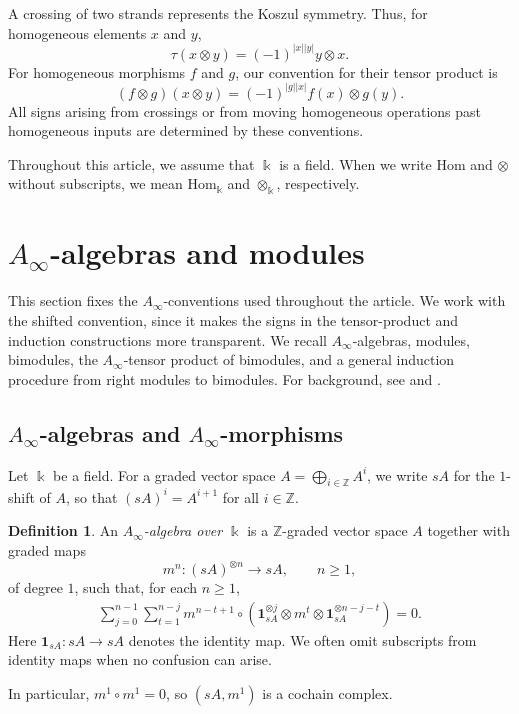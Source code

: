 \documentclass[a4paper, 11pt]{amsart}
\theoremstyle{definition}
\newtheorem{defn}[thm]{Definition}
\theoremstyle{remark}
\numberwithin{equation}{section}
\newcommand{\Hom}{\mathrm{Hom}}
\begin{document}
A crossing of two strands represents the Koszul symmetry. Thus, for
homogeneous elements $x$ and $y$,
\[
\tau(x\otimes y)=(-1)^{|x||y|}y\otimes x.
\]
For homogeneous morphisms $f$ and $g$, our convention for their tensor
product is
\[
(f\otimes g)(x\otimes y)
   =(-1)^{|g||x|}f(x)\otimes g(y).
\]
All signs arising from crossings or from moving homogeneous
operations past homogeneous inputs are determined by these
conventions.







Throughout this article, we assume that $\Bbbk$ is a field. When we write $\Hom$ and $\otimes$ without subscripts, we mean $\Hom_\Bbbk$ and $\otimes_\Bbbk$, respectively.



\section{\texorpdfstring{$A_{\infty}$}{}-algebras and modules}\label{section:ainfinityalgebra}

This section fixes the $A_\infty$-conventions used throughout the article. We work with the shifted convention, since it makes the signs in the tensor-product and induction constructions more transparent. We recall $A_\infty$-algebras, modules, bimodules, the $A_\infty$-tensor product of bimodules, and a general induction procedure from right modules to bimodules. For background, see \cite[Section 5]{GJ} and \cite[Section 2]{Vor}.

\subsection{\texorpdfstring{$A_{\infty}$}{}-algebras and \texorpdfstring{$A_{\infty}$}{}-morphisms}\label{subsection:Ainfinityalgebra}
Let $\Bbbk$ be a field. For a graded vector space $A=\bigoplus_{i\in \mathbb Z} A^i$, we write $sA$ for the $1$-shift of $A$, so that $(sA)^i=A^{i+1}$ for all $i\in \mathbb Z$.
\begin{defn}
An {\it $A_{\infty}$-algebra over $\Bbbk$} is a $\mathbb Z$-graded vector space $A$ together with graded maps
\[
m^n \colon (sA)^{\otimes n} \to sA,
\qquad n\geq 1,
\]
of degree $1$, such that, for each $n\geq 1$,
\begin{align}\label{align:A-infinity3}
 \sum_{j=0}^{n-1}\sum_{t=1}^{n-j} m^{n-t+1}\circ (\mathbf 1_{s A} ^{\otimes j} \otimes m^t \otimes \mathbf 1_{sA} ^{\otimes n-j-t}) = 0.
\end{align}
Here $\mathbf 1_{sA}\colon sA\to sA$ denotes the identity map. We often omit subscripts from identity maps when no confusion can arise.

In particular, $m^1\circ m^1=0$, so $(sA,m^1)$ is a cochain complex.
\end{defn}
\end{document}
